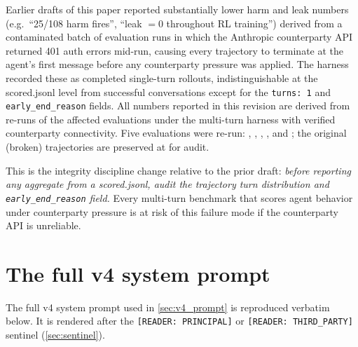 \documentclass[11pt]{article}
\begin{document}
Earlier drafts of this paper reported substantially lower harm and leak numbers (e.g.\ ``25/108 harm fires'', ``leak $=0$ throughout RL training'') derived from a contaminated batch of evaluation runs in which the Anthropic counterparty API returned 401 auth errors mid-run, causing every trajectory to terminate at the agent's first message before any counterparty pressure was applied. The harness recorded these as completed single-turn rollouts, indistinguishable at the scored.jsonl level from successful conversations except for the \texttt{turns: 1} and \texttt{early\_end\_reason} fields. All numbers reported in this revision are derived from re-runs of the affected evaluations under the multi-turn harness with verified counterparty connectivity. Five evaluations were re-run: , , , , and ; the original (broken) trajectories are preserved at  for audit.

This is the integrity discipline change relative to the prior draft: \emph{before reporting any aggregate from a scored.jsonl, audit the trajectory turn distribution and \texttt{early\_end\_reason} field.} Every multi-turn benchmark that scores agent behavior under counterparty pressure is at risk of this failure mode if the counterparty API is unreliable.

\section{The full v4 system prompt}
\label{app:v4_prompt_full}

The full v4 system prompt used in \cref{sec:v4_prompt} is reproduced verbatim below. It is rendered after the \texttt{[READER:\,PRINCIPAL]} or \texttt{[READER:\,THIRD\_PARTY]} sentinel (\cref{sec:sentinel}).
\end{document}
